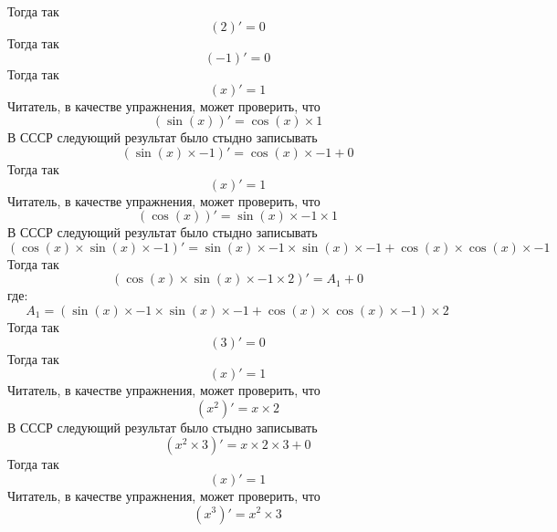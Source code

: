 \documentclass{article}
\begin{document}
Тогда так\newline
\[( 2 )' =  0 \]\newline
Тогда так\newline
\[( -1 )' =  0 \]\newline
Тогда так\newline
\[( x )' =  1 \]\newline
Читатель, в качестве упражнения, может проверить, что\newline
\[(\sin( x ))' = \cos( x )\times 1 \]\newline
В СССР следующий результат было стыдно записывать\newline
\[(\sin( x )\times -1 )' = \cos( x )\times -1 + 0 \]\newline
Тогда так\newline
\[( x )' =  1 \]\newline
Читатель, в качестве упражнения, может проверить, что\newline
\[(\cos( x ))' = \sin( x )\times -1 \times 1 \]\newline
В СССР следующий результат было стыдно записывать\newline
\[(\cos( x )\times\sin( x )\times -1 )' = \sin( x )\times -1 \times\sin( x )\times -1 +\cos( x )\times\cos( x )\times -1 \]\newline
Тогда так\newline
\[(\cos( x )\times\sin( x )\times -1 \times 2 )' =  A_{1} + 0 \]\newline
где:\[A_{1} = (\sin( x )\times -1 \times\sin( x )\times -1 +\cos( x )\times\cos( x )\times -1 )\times 2 \]\newline
Тогда так\newline
\[( 3 )' =  0 \]\newline
Тогда так\newline
\[( x )' =  1 \]\newline
Читатель, в качестве упражнения, может проверить, что\newline
\[( x ^{ 2 })' =  x \times 2 \]\newline
В СССР следующий результат было стыдно записывать\newline
\[( x ^{ 2 }\times 3 )' =  x \times 2 \times 3 + 0 \]\newline
Тогда так\newline
\[( x )' =  1 \]\newline
Читатель, в качестве упражнения, может проверить, что\newline
\[( x ^{ 3 })' =  x ^{ 2 }\times 3 \]\newline
\end{document}
